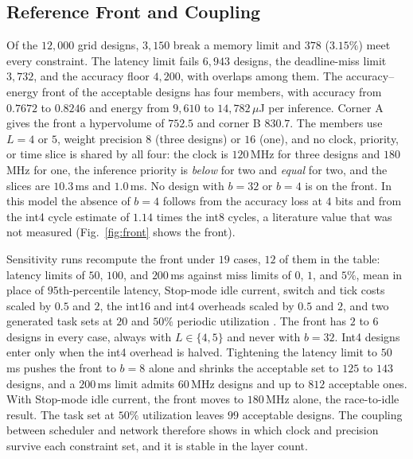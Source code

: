 
\subsection{Reference Front and Coupling}
\label{sec:front}
\label{sec:sensitivity}
Of the $12{,}000$ grid designs, $3{,}150$ break a memory limit and $378$
($3.15\%$) meet every constraint. The latency limit fails $6{,}943$ designs,
the deadline-miss limit $3{,}732$, and the accuracy floor $4{,}200$, with
overlaps among them. The accuracy--energy front of the
acceptable designs has four members, with accuracy from $0.7672$ to $0.8246$
and energy from $9{,}610$ to $14{,}782\,\mu$J per inference. Corner A gives
the front a hypervolume of $752.5$ and corner B $830.7$. The members use
$L=4$ or $5$, weight precision $8$ (three designs) or $16$ (one), and no
clock, priority, or time slice is shared by all four: the clock is
$120$\,MHz for three designs and $180$\,MHz for one, the inference priority is
\emph{below} for two and \emph{equal} for two, and the slices are $10.3$\,ms
and $1.0$\,ms. No design with $b=32$ or $b=4$ is on the front. In this model
the absence of $b=4$ follows from the accuracy loss at $4$ bits and from the
int4 cycle estimate of $1.14$ times the int8 cycles, a literature value that
was not measured (Fig.~\ref{fig:front} shows the front).





Sensitivity runs recompute the front under $19$ cases, $12$ of them in
the table: latency limits of
$50$, $100$, and $200$\,ms against miss limits of $0$, $1$, and $5\%$, mean in
place of $95$th-percentile latency, Stop-mode idle current, switch and tick
costs scaled by $0.5$ and $2$, the int16 and int4 overheads scaled by $0.5$
and $2$, and two generated task sets at $20$ and $50\%$ periodic utilization
\cite{kim2021harmonic}. The front has $2$ to $6$ designs in every case, always
with $L\in\{4,5\}$ and never with $b=32$. Int4 designs enter only when the
int4 overhead is halved. Tightening the latency limit to $50$\,ms pushes the
front to $b=8$ alone and shrinks the acceptable set to $125$ to $143$
designs, and a $200$\,ms limit admits $60$\,MHz designs and up to $812$
acceptable ones. With Stop-mode idle current, the front moves to
$180$\,MHz alone, the race-to-idle result. The task set at $50\%$
utilization leaves $99$ acceptable designs. The coupling between
scheduler and network therefore shows in which clock and precision survive
each constraint set, and it is stable in the layer count.

